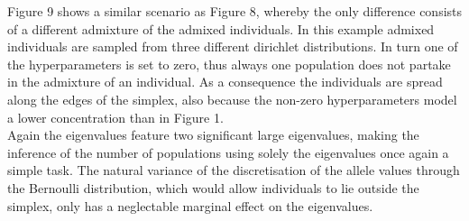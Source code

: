 \documentclass[a4paper, 11pt]{article}
\begin{document}
Figure 9 shows a similar scenario as Figure 8, whereby the only difference consists of a different admixture of the admixed individuals. In this example admixed individuals are sampled from three different dirichlet distributions. In turn one of the hyperparameters is set to zero, thus always one population does not partake in the admixture of an individual. As a consequence the individuals are spread along the edges of the simplex, also because the non-zero hyperparameters model a lower concentration than in Figure 1. \\
Again the eigenvalues feature two significant large eigenvalues, making the inference of the number of populations using solely the eigenvalues once again a simple task. The natural variance of the discretisation of the allele values through the Bernoulli distribution, which would allow individuals to lie outside the simplex, only has a neglectable marginal effect on the eigenvalues.
\end{document}
